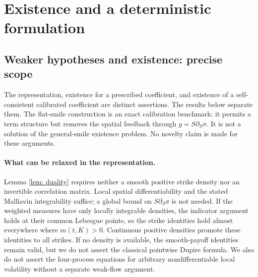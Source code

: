 \section{Existence and a deterministic formulation}\label{sec: theory}
\subsection{Weaker hypotheses and existence: precise scope}\label{subsec: existence}
The representation, existence for a prescribed coefficient, and existence of a
self-consistent calibrated coefficient are distinct assertions. The results below
separate them. The flat-smile construction is an exact calibration benchmark:
it permits a term structure but removes the spatial feedback through
$g=S\partial_S\sigma$. It is not a solution of the general-smile existence
problem. No novelty claim is made for these arguments.

\paragraph{What can be relaxed in the representation.}
Lemma \ref{lem: duality} requires neither a smooth positive strike density nor an
invertible correlation matrix. Local spatial differentiability and the stated
Malliavin integrability suffice; a global bound on $S\partial_S\sigma$ is not
needed. If the weighted measures have only locally integrable densities, the
indicator argument holds at their common Lebesgue points, so the strike identities
hold almost everywhere where $m(t,K)>0$. Continuous positive densities promote
these identities to all strikes. If no density is available, the smooth-payoff
identities remain valid, but we do not assert the classical pointwise Dupire
formula. We also do not assert the four-process equations for arbitrary
nondifferentiable local volatility without a separate weak-flow argument.

